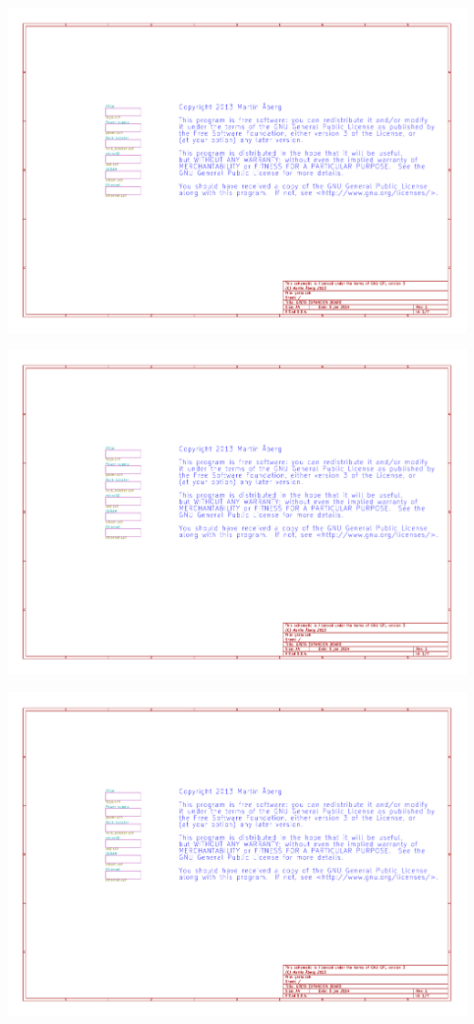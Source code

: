 \documentclass[a4paper]{report}
\begin{document}
\begin{centering}
\includegraphics[width=\textwidth, page=5]{schematic.pdf}

\includegraphics[width=\textwidth, page=3]{schematic.pdf}

\includegraphics[width=\textwidth, page=2]{schematic.pdf}


\end{centering}
\end{document}
